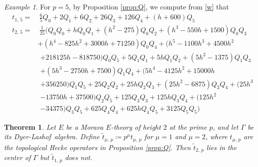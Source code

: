 \documentclass{gtpart}
\newtheorem{thm}[equation]{Theorem}
\theoremstyle{definition}
\theoremstyle{remark}
\newtheorem{ex}[equation]{Example}
\newcommand{\DL}{Dyer-Lashof~}
\newcommand{\G}{\Gamma}
\newcommand{\ce}{\coloneqq}
\renewcommand{\=}{\approx}
\renewcommand{\-}{\sim}
\numberwithin{equation}{section}
\begin{document}
\begin{ex}
 \label{ex:t5}
 For $p = 5$, by Proposition \ref{prop:Q}, we compute from \eqref{w} that 
 \begin{equation*}
  \begin{split}
   t_{1,\,5} = & ~ \frac{6}{5} Q_0 + 2 Q_1 + 6 Q_2 + 26 Q_3 + 126 Q_4 
                 + (h + 600) Q_5 \\
   t_{2,\,5} = & ~ \frac{1}{25} \big( Q_0 Q_0 + h Q_0 Q_1 + (h^2 - 275) Q_0 Q_2 
                 + (h^3 - 550 h + 1500) Q_0 Q_3 \\
               & + (h^4 - 825 h^2 + 3000 h + 71250) Q_0 Q_4 + (h^5 - 1100 h^3 
                 + 4500 h^2 
  \end{split}
 \end{equation*}
 \begin{equation*}
  \begin{split}
  \qquad\qquad & + 218125 h - 818750) Q_0 Q_5 + 5 Q_1 Q_1 + 5 h Q_1 Q_2 + (5 h^2 
                 - 1375) Q_1 Q_3 \\
               & + (5 h^3 - 2750 h + 7500) Q_1 Q_4 + (5 h^4 - 4125 h^2 
                 + 15000 h \\
               & + 356250) Q_1 Q_5 + 25 Q_2 Q_2 + 25 h Q_2 Q_3 + (25 h^2 
                 - 6875) Q_2 Q_4 + (25 h^3 \\
               & - 13750 h + 37500) Q_2 Q_5 + 125 Q_3 Q_3 + 125 h Q_3 Q_4 
                 + (125 h^2 \\
               & - 34375) Q_3 Q_5 + 625 Q_4 Q_4 + 625 h Q_4 Q_5 
                 + 3125 Q_5 Q_5 \big) 
  \end{split}
 \end{equation*}
\end{ex}

\begin{thm}
 \label{thm:center}
 Let $E$ be a Morava $E$-theory of height $2$ at the prime $p$, and let $\G$ be 
 its \DL algebra.  Define $\tilde{t}_{\mu,\,p} \ce p^\mu t_{\mu,\,p}$ for 
 $\mu = 1$ and $\mu = 2$, where $t_{\mu,\,p}$ are the topological Hecke 
 operators in Proposition \ref{prop:Q}.  Then $\tilde{t}_{2,\,p}$ lies in the 
 center of $\G$ but $\tilde{t}_{1,\,p}$ does not.  
\end{thm}
\end{document}
